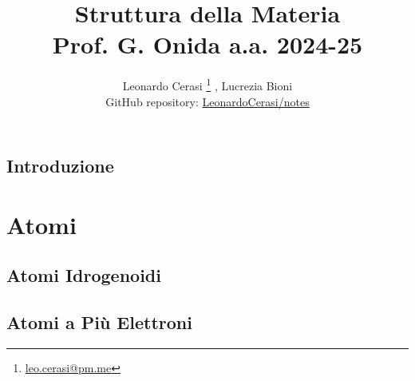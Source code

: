 \documentclass[a4paper, 12pt]{book}
\title{\Huge\textbf{Struttura della Materia} \\ \large Prof. G. Onida a.a. 2024-25}
\author{Leonardo Cerasi%
	\thanks{\scriptsize\href{mailto:leonardo.cerasi@studenti.unimi.it}{leo.cerasi@pm.me}}%
	, Lucrezia Bioni\\
	\small GitHub repository: \href{https://github.com/LeonardoCerasi/notes}{LeonardoCerasi/notes}}
\begin{document}
\frontmatter

\maketitle
\tableofcontents
\pagestyle{indice}

\mainmatter

\chapter*{Introduzione}
\pagestyle{introd}


\part{Atomi}
\pagestyle{body}

\chapter{Atomi Idrogenoidi}


\chapter{Atomi a Più Elettroni}

\end{document}
